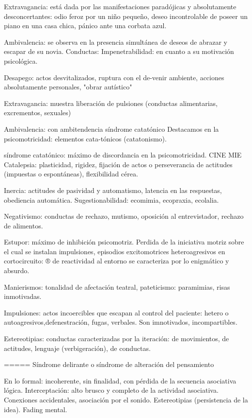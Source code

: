 \documentclass[encares.tex]{subfiles}
\begin{document}
Extravagancia: está dada por las manifestaciones paradójicas y absolutamente desconcertantes: odio feroz por un niño pequeño, deseo incontrolable de poseer un piano en una casa chica, pánico ante una corbata azul.

Ambivalencia: se observa en la presencia simultánea de deseos de abrazar y escapar de su novia. Conductas: Impenetrabilidad: en cuanto a su motivación psicológica.

Desapego: actos desvitalizados, ruptura con el de-venir ambiente, acciones absolutamente personales, "obrar autístico"

Extravagancia: muestra liberación de pulsiones (conductas alimentarias, excrementos, sexuales)

Ambivalencia: con ambitendencia síndrome catatónico Destacamos en la psicomotricidad: elementos cata-tónicos (catatonismo).

síndrome catatónico: máximo de discordancia en la psicomotricidad. CINE MIE Catalepsia: plasticidad, rigidez, fijación de actos o perseverancia de actitudes (impuestas o espontáneas), flexibilidad cérea.

Inercia: actitudes de pasividad y automatismo, latencia en las respuestas, obediencia automática. Sugestionabilidad: ecomimia, ecopraxia, ecolalia.

Negativismo: conductas de rechazo, mutismo, oposición al entrevistador, rechazo de alimentos.

Estupor: máximo de inhibición psicomotriz. Perdida de la iniciativa motriz sobre el cual se instalan impulsiones, episodios excitomotrices heteroagresivos en cortocircuito: ® de reactividad al entorno se caracteriza por lo enigmático y absurdo.

Manierismos: tonalidad de afectación teatral, pateticismo: paramimias, risas inmotivadas.

Impulsiones: actos incoercibles que escapan al control del paciente: hetero o autoagresivos,defenestración, fugas, verbales. Son imnotivados, incompartibles.

Estereotipias: conductas caracterizadas por la iteración: de movimientos, de actitudes, lenguaje (verbigeración), de conductas.

===== Síndrome delirante o síndrome de alteración del pensamiento

En lo formal: incoherente, sin finalidad, con pérdida de la secuencia asociativa lógica. Interceptación: alto brusco y completo de la actividad asociativa. Conexiones accidentales, asociación por el sonido. Estereotipias (persistencia de la idea). Fading mental.
\end{document}
